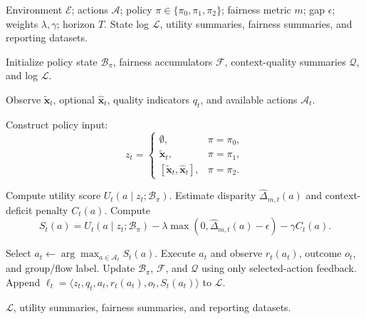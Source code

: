 \documentclass[conference]{IEEEtran}
\begin{document}
\begin{algorithm}[t]
\caption{EQUITAS-Mediated Fairness-Aware Routing}
\label{alg:equitas_bandit}
\small
\begin{tcolorbox}[
  colback=gray!4,
  colframe=gray!35,
  boxrule=0.3pt,
  arc=2pt,
  left=3pt,
  right=3pt,
  top=3pt,
  bottom=3pt
]
\begin{algorithmic}
\Require Environment $\mathcal{E}$; actions $\mathcal{A}$; policy
$\pi \in \{\pi_0,\pi_1,\pi_2\}$; fairness metric $m$; gap $\epsilon$;
weights $\lambda,\gamma$; horizon $T$.
\Ensure State log $\mathcal{L}$, utility summaries, fairness summaries, and
reporting datasets.

\State Initialize policy state $\mathcal{B}_{\pi}$, fairness accumulators
$\mathcal{F}$, context-quality summaries $\mathcal{Q}$, and log
$\mathcal{L}$.

    \State Observe $\tilde{\mathbf{x}}_t$, optional $\hat{\mathbf{x}}_t$,
    quality indicators $q_t$, and available actions $\mathcal{A}_t$.

    \State Construct policy input:
    \[
    z_t =
    \begin{cases}
    \emptyset, & \pi=\pi_0,\\
    \tilde{\mathbf{x}}_t, & \pi=\pi_1,\\
    [\tilde{\mathbf{x}}_t,\hat{\mathbf{x}}_t], & \pi=\pi_2.
    \end{cases}
    \]

        \State Compute utility score $U_t(a\mid z_t;\mathcal{B}_{\pi})$.
        \State Estimate disparity $\widehat{\Delta}_{m,t}(a)$ and
        context-deficit penalty $C_t(a)$.
        \State Compute
        \[
        S_t(a)=
        U_t(a\mid z_t;\mathcal{B}_{\pi})
        -\lambda\max(0,\widehat{\Delta}_{m,t}(a)-\epsilon)
        -\gamma C_t(a).
        \]
    \EndFor

    \State Select $a_t \leftarrow \arg\max_{a\in\mathcal{A}_t} S_t(a)$.
    \State Execute $a_t$ and observe $r_t(a_t)$, outcome $o_t$, and group/flow label.
    \State Update $\mathcal{B}_{\pi}$, $\mathcal{F}$, and $\mathcal{Q}$
    using only selected-action feedback.
    \State Append
    $\ell_t=\langle z_t,q_t,a_t,r_t(a_t),o_t,S_t(a_t)\rangle$
    to $\mathcal{L}$.
\EndFor

\State \Return $\mathcal{L}$, utility summaries, fairness summaries, and
reporting datasets.
\end{algorithmic}
\end{tcolorbox}
\end{algorithm}
\end{document}
